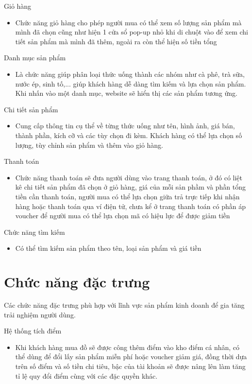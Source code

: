 \documentclass[a4paper,12pt]{report}
\numberwithin{equation}{chapter}
\begin{document}
Giỏ hàng
\begin{itemize}[leftmargin=2.2cm]
\item Chức năng giỏ hàng cho phép người mua có thể xem số lượng sản phẩm mà mình đã chọn cũng như hiện 1 cửa sổ pop-up nhỏ khi di chuột vào để xem chi tiết sản phẩm mà mình đã thêm, ngoài ra còn thể hiện số tiền tổng
\end{itemize}

Danh mục sản phẩm
\begin{itemize}[leftmargin=2.2cm]
\item Là chức năng giúp phân loại thức uống thành các nhóm như cà phê, trà sữa, nước ép, sinh tố,... giúp khách hàng dễ dàng tìm kiếm và lựa chọn sản phẩm. Khi nhấn vào một danh mục, website sẽ hiển thị các sản phẩm tương ứng.
\end{itemize}

Chi tiết sản phẩm
\begin{itemize}[leftmargin=2.2cm]
\item Cung cấp thông tin cụ thể về từng thức uống như tên, hình ảnh, giá bán, thành phần, kích cỡ và các tùy chọn đi kèm. Khách hàng có thể lựa chọn số lượng, tùy chỉnh sản phẩm và thêm vào giỏ hàng.
\end{itemize}

Thanh toán
\begin{itemize}[leftmargin=2.2cm]
\item Chức năng thanh toán sẽ đưa người dùng vào trang thanh toán, ở đó có liệt kê chi tiết sản phẩm đã chọn ở giỏ hàng, giá của mỗi sản phầm và phần tổng tiền cần thanh toán, người mua có thể lựa chọn giữa trả trực tiếp khi nhận hàng hoặc thanh toán qua ví điện tử, chưa kể ở trang thanh toán có phần áp voucher để người mua có thể lựa chọn mã có hiệu lực để được giảm tiền
\end{itemize}

Chức năng tìm kiếm
\begin{itemize}[leftmargin=2.2cm]
\item Có thể tìm kiếm sản phẩm theo tên, loại sản phẩm và giá tiền
\end{itemize}

\section{Chức năng đặc trưng}
Các chức năng đặc trưng phù hợp với lĩnh vực sản phẩm kinh doanh để gia tăng trải nghiệm người dùng.

Hệ thống tích điểm
\begin{itemize}[leftmargin=2.2cm]
\item Khi khách hàng mua đồ sẽ được công thêm điểm vào kho điểm cá nhân, có thể dùng để đổi lấy sản phẩm miễn phí hoặc voucher giảm giá, đồng thời dựa trên số điểm và số tiền chi tiêu, bậc của tài khoản sẽ được nâng lên làm tăng tỉ lệ quy đổi điểm cùng với các đặc quyền khác.
\end{itemize}
\end{document}
